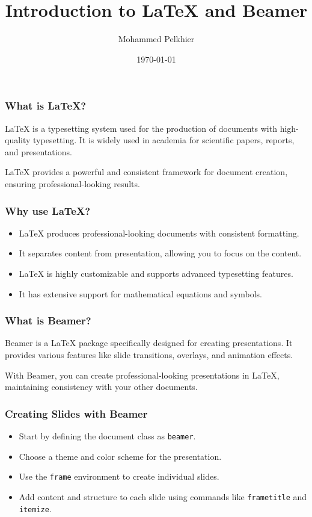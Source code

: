 \documentclass{beamer}
\title{Introduction to LaTeX and Beamer}
\author{Mohammed Pelkhier}
\date{\today}
\begin{document}
\begin{frame}
  \titlepage
\end{frame}


\begin{frame}
  \frametitle{What is LaTeX?}
  LaTeX is a typesetting system used for the production of documents with high-quality typesetting. It is widely used in academia for scientific papers, reports, and presentations.

  \vspace{0.5cm}
  
  LaTeX provides a powerful and consistent framework for document creation, ensuring professional-looking results.
\end{frame}


\begin{frame}
  \frametitle{Why use LaTeX?}
  \begin{itemize}
    \item LaTeX produces professional-looking documents with consistent formatting.
    \item It separates content from presentation, allowing you to focus on the content.
    \item LaTeX is highly customizable and supports advanced typesetting features.
    \item It has extensive support for mathematical equations and symbols.
  \end{itemize}
\end{frame}


\begin{frame}
  \frametitle{What is Beamer?}
  Beamer is a LaTeX package specifically designed for creating presentations. It provides various features like slide transitions, overlays, and animation effects.

  \vspace{0.5cm}
  
  With Beamer, you can create professional-looking presentations in LaTeX, maintaining consistency with your other documents.
\end{frame}


\begin{frame}
  \frametitle{Creating Slides with Beamer}
  \begin{itemize}
    \item Start by defining the document class as \texttt{beamer}.
    \item Choose a theme and color scheme for the presentation.
    \item Use the \texttt{frame} environment to create individual slides.
    \item Add content and structure to each slide using commands like \texttt{frametitle} and \texttt{itemize}.
  \end{itemize}
\end{frame}
\end{document}
